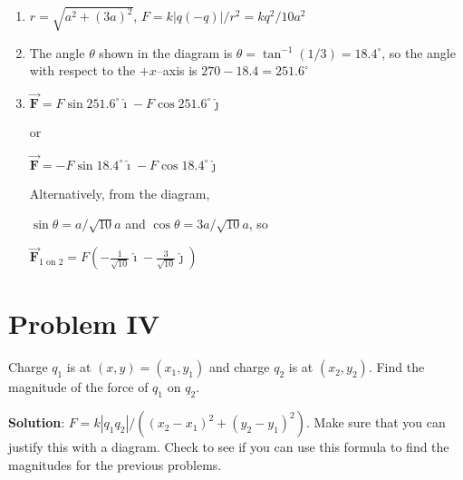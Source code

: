 \documentclass{article}
\renewcommand{\mbox}{\text}
\newcommand{\ds}[0]{\displaystyle}
\newcommand{\ihat}[0]{\hat{\boldsymbol{\imath}}}
\newcommand{\jhat}[0]{\hat{\boldsymbol{\jmath}}}
\newcommand{\bfvec}[1]{\vec{\mathbf{#1}}}
\begin{document}
    \begin{enumerate}

      \item $r=\sqrt{a^2+(3a)^2}$, $F=k|q(-q)|/r^2=kq^2/10a^2$

      \item The angle $\theta$ shown in the diagram is $\theta=\tan^{-1}(1/3)=18.4^\circ$, so the angle with respect to the $+x$--axis is $270-18.4=251.6^\circ$

      \item $\bfvec{F}=F\sin251.6^\circ\ihat - F\cos251.6^\circ\jhat$

            or

            $\bfvec{F}=-F\sin 18.4^\circ\ihat - F\cos18.4^\circ\jhat$

            Alternatively, from the diagram,

            $\sin\theta = a/\sqrt{10}a$ and $\cos\theta = 3a/\sqrt{10}a$, so

            $\ds\bfvec{F}_{1\mbox{ on } 2} = F\left(-\frac{1}{\sqrt{10}}\ihat - \frac{3}{\sqrt{10}}\jhat\right)$

    \end{enumerate}

\newpage
\else


\fi

\section{Problem IV}

Charge $q_1$ is at $(x,y)=(x_1,y_1)$ and charge $q_2$ is at $(x_2, y_2)$. Find the magnitude of the force of $q_1$ on $q_2$.

\ifsolutions
{\bf Solution}: $F=k|q_1q_2|/\left((x_2-x_1)^2 + (y_2-y_1)^2\right)$. Make sure that you can justify this with a diagram. Check to see if you can use this formula to find the magnitudes for the previous problems.
\fi
\end{document}
